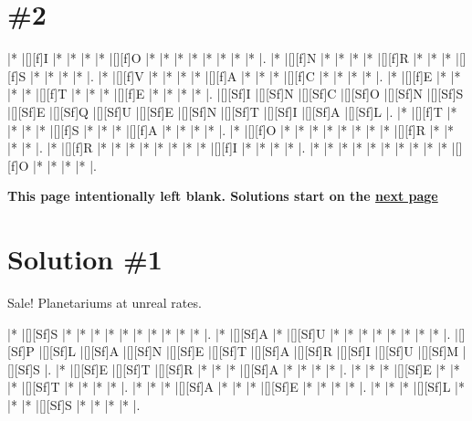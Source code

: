 \documentclass[letterpaper]{article}
\begin{document}
\section*{\#2}
\begin{Puzzle}{15}{10}
|*        |[][f]I   |*        |*        |*        |*        |[][f]O   |*        |*        |*        |*        |*        |*        |*        |*        |.
|*        |[][f]N   |*        |*        |*        |*        |[][f]R   |*        |*        |*        |[][f]S   |*        |*        |*        |*        |.
|*        |[][f]V   |*        |*        |*        |*        |[][f]A   |*        |*        |*        |[][f]C   |*        |*        |*        |*        |.
|*        |[][f]E   |*        |*        |*        |*        |[][f]T   |*        |*        |*        |[][f]E   |*        |*        |*        |*        |.
|[][Sf]I  |[][Sf]N  |[][Sf]C  |[][Sf]O  |[][Sf]N  |[][Sf]S  |[][Sf]E  |[][Sf]Q  |[][Sf]U  |[][Sf]E  |[][Sf]N  |[][Sf]T  |[][Sf]I  |[][Sf]A  |[][Sf]L  |.
|*        |[][f]T   |*        |*        |*        |*        |[][f]S   |*        |*        |*        |[][f]A   |*        |*        |*        |*        |.
|*        |[][f]O   |*        |*        |*        |*        |*        |*        |*        |*        |[][f]R   |*        |*        |*        |*        |.
|*        |[][f]R   |*        |*        |*        |*        |*        |*        |*        |*        |[][f]I   |*        |*        |*        |*        |.
|*        |*        |*        |*        |*        |*        |*        |*        |*        |*        |[][f]O   |*        |*        |*        |*        |.
\end{Puzzle}

\begin{center}
\textbf{This page intentionally left blank. Solutions start on the \hyperlink{page.3}{next page}}
\end{center}

\newpage

\section*{Solution \#1}
Sale! Planetariums at unreal rates.

\vspace*{0.5cm}
\begin{Puzzle}{12}{8}
|*        |[][Sf]S  |*        |*        |*        |*        |*        |*        |*        |*        |*        |*        |.
|*        |[][Sf]A  |*        |[][Sf]U  |*        |*        |*        |*        |*        |*        |*        |*        |.
|[][Sf]P  |[][Sf]L  |[][Sf]A  |[][Sf]N  |[][Sf]E  |[][Sf]T  |[][Sf]A  |[][Sf]R  |[][Sf]I  |[][Sf]U  |[][Sf]M  |[][Sf]S  |.
|*        |[][Sf]E  |[][Sf]T  |[][Sf]R  |*        |*        |*        |[][Sf]A  |*        |*        |*        |*        |.
|*        |*        |*        |[][Sf]E  |*        |*        |*        |[][Sf]T  |*        |*        |*        |*        |.
|*        |*        |*        |[][Sf]A  |*        |*        |*        |[][Sf]E  |*        |*        |*        |*        |.
|*        |*        |*        |[][Sf]L  |*        |*        |*        |[][Sf]S  |*        |*        |*        |*        |.
\end{Puzzle}
\end{document}
